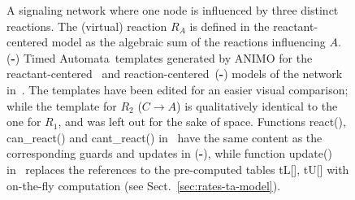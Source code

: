 \documentclass{llncs}
\newcommand{\ta}{Timed Automaton}
\newcommand{\tas}{Timed Automata}
\begin{document}
\begin{figure}[!htb]
\begin{center}
  \end{center}
  \caption{
{\bf\protect{}} A signaling network where one node is influenced by three distinct reactions.
The (virtual) reaction $R_A$ is defined in
the reactant-centered model as the algebraic sum of the reactions influencing $A$.
({\bf\protect{}\--{}\protect{}}) \tas\ templates generated by ANIMO for the reactant-centered~{\bf\protect{}}
 and reaction-centered~({\bf\protect{}\--{}\protect{}}) models of the network in~{\bf\protect{}}.
The templates have been edited for an easier visual comparison; while the template for $R_2$ ($C \rightarrow A$) is qualitatively identical to the one for $R_1$,
and was left out for the sake of space. Functions {\sf react()}, {\sf can\_react()} and {\sf cant\_react()}
in~{\protect{}} have the same content as the corresponding guards and updates in ({\bf\protect{}\--{}\protect{}}),
while function {\sf update()} in~{\protect{}}
replaces the references to the pre-computed tables {\sf tL[]}, {\sf tU[]} with on-the-fly computation (see Sect.~\ref{sec:rates-ta-model}).
\label{fig:ta-models}}
\end{figure}
\end{document}
